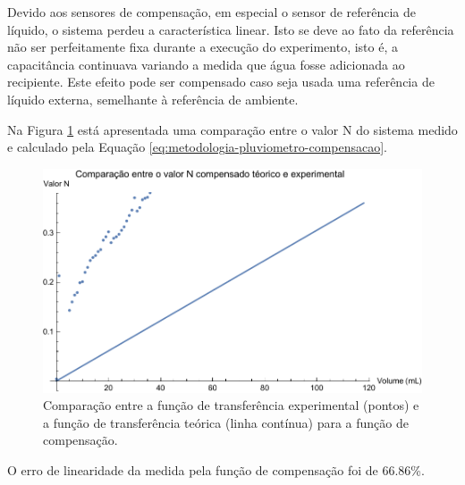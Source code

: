 \documentclass[a4paper]{instrumentacao}
\begin{document}
Devido aos sensores de compensação, em especial o sensor de referência de líquido, o sistema perdeu a característica linear. Isto se deve ao fato da referência não ser perfeitamente fixa durante a execução do experimento, isto é, a capacitância continuava variando a medida que água fosse adicionada ao recipiente. Este efeito pode ser compensado caso seja usada uma referência de líquido externa, semelhante à referência de ambiente.

Na Figura \ref{fig:resultados-pluviometro-compensacao-comparacao} está apresentada uma comparação entre o valor N do sistema medido e calculado pela Equação \ref{eq:metodologia-pluviometro-compensacao}.

\begin{figure}[H]
	\centering \includegraphics[width=\textwidth]{Nivel/Experimental/Compensado-Comparacao.pdf}
	\caption{Comparação entre a função de transferência experimental (pontos) e a função de transferência teórica (linha contínua) para a função de compensação.}
	\label{fig:resultados-pluviometro-compensacao-comparacao}
\end{figure}

O erro de linearidade da medida pela função de compensação foi de 66.86\%.
\end{document}
